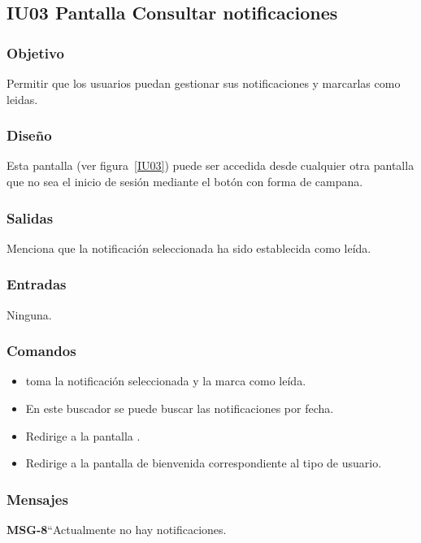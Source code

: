 
\subsection{IU03 Pantalla Consultar notificaciones}

\subsubsection{Objetivo}
Permitir que los usuarios puedan gestionar sus notificaciones y marcarlas como leidas.
\subsubsection{Diseño}
    Esta pantalla  (ver figura~\ref{IU03}) puede ser accedida desde cualquier otra pantalla que no sea el inicio de sesión mediante el botón con forma de campana.

\subsubsection{Salidas}
Menciona que la notificación seleccionada ha sido establecida como leída.
\subsubsection{Entradas}
   Ninguna.

\subsubsection{Comandos}
\begin{itemize}
    \item {} toma la notificación seleccionada y la marca como leída.
    \item {} En este buscador se puede buscar las notificaciones por fecha.
    \item {} Redirige a la pantalla .
    \item {} Redirige a la pantalla de bienvenida correspondiente al tipo de usuario.
\end{itemize}

\subsubsection{Mensajes}
     
\begin{Citemize}
    \item {\bf MSG-8}{``Actualmente no hay notificaciones.}
\end{Citemize}


